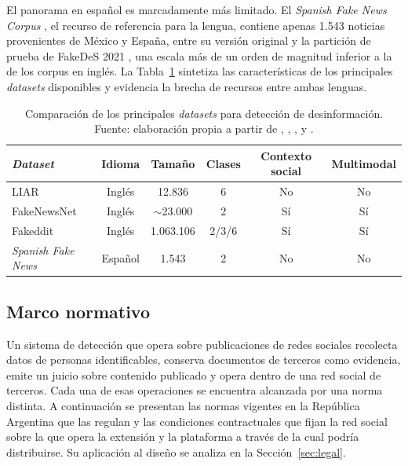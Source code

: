 El panorama en español es marcadamente más limitado. El \textit{Spanish Fake News Corpus} \parencite{PosadasEtAl2019}, el recurso de referencia para la lengua, contiene apenas 1.543 noticias provenientes de México y España, entre su versión original y la partición de prueba de FakeDeS 2021 \parencite{GomezAdornoEtAl2021}, una escala más de un orden de magnitud inferior a la de los corpus en inglés. La Tabla~\ref{tab:datasets} sintetiza las características de los principales \textit{datasets} disponibles y evidencia la brecha de recursos entre ambas lenguas.

\begin{table}[t]
  \centering
  \caption{Comparación de los principales \textit{datasets} para detección de desinformación. Fuente: elaboración propia a partir de \textcite{Wang2017}, \textcite{ShuEtAl2020}, \textcite{NakamuraEtAl2020}, \textcite{PosadasEtAl2019} y \textcite{GomezAdornoEtAl2021}.}
  \label{tab:datasets}
  \begin{tabular}{l c c c c c}
    \hline
    \textbf{\textit{Dataset}} & \textbf{Idioma} & \textbf{Tamaño} & \textbf{Clases} & \textbf{Contexto social} & \textbf{Multimodal} \\
    \hline
    LIAR & Inglés & 12.836 & 6 & No & No \\
    FakeNewsNet & Inglés & $\sim$23.000 & 2 & Sí & Sí \\
    Fakeddit & Inglés & 1.063.106 & 2/3/6 & Sí & Sí \\
    \textit{Spanish Fake News} & Español & 1.543 & 2 & No & No \\
    \hline
  \end{tabular}
\end{table}

\subsection{Marco normativo}
\label{sec:marco-normativo}

Un sistema de detección que opera sobre publicaciones de redes sociales recolecta datos de personas identificables, conserva documentos de terceros como evidencia, emite un juicio sobre contenido publicado y opera dentro de una red social de terceros. Cada una de esas operaciones se encuentra alcanzada por una norma distinta. A continuación se presentan las normas vigentes en la República Argentina que las regulan y las condiciones contractuales que fijan la red social sobre la que opera la extensión y la plataforma a través de la cual podría distribuirse. Su aplicación al diseño se analiza en la Sección~\ref{sec:legal}.


